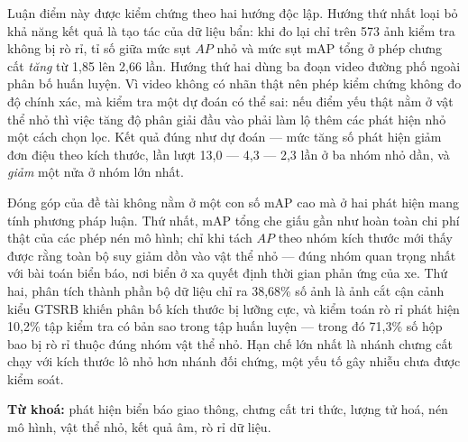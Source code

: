 Luận điểm này được kiểm chứng theo hai hướng độc lập. Hướng thứ nhất loại bỏ khả năng kết quả là
tạo tác của dữ liệu bẩn: khi đo lại chỉ trên 573 ảnh kiểm tra không bị rò rỉ, tỉ số giữa mức sụt
$AP$ nhỏ và mức sụt mAP tổng ở phép chưng cất \emph{tăng} từ 1,85 lên 2,66 lần. Hướng thứ hai dùng
ba đoạn video đường phố ngoài phân bố huấn luyện. Vì video không có nhãn thật nên phép kiểm chứng
không đo độ chính xác, mà kiểm tra một dự đoán có thể sai: nếu điểm yếu thật nằm ở vật thể nhỏ thì
việc tăng độ phân giải đầu vào phải làm lộ thêm các phát hiện nhỏ một cách chọn lọc. Kết quả đúng
như dự đoán --- mức tăng số phát hiện giảm đơn điệu theo kích thước, lần lượt 13,0 --- 4,3 --- 2,3
lần ở ba nhóm nhỏ dần, và \emph{giảm} một nửa ở nhóm lớn nhất.

Đóng góp của đề tài không nằm ở một con số mAP cao mà ở hai phát hiện mang tính phương pháp luận.
Thứ nhất, mAP tổng che giấu gần như hoàn toàn chi phí thật của các phép nén mô hình; chỉ khi tách
$AP$ theo nhóm kích thước mới thấy được rằng toàn bộ suy giảm dồn vào vật thể nhỏ --- đúng nhóm
quan trọng nhất với bài toán biển báo, nơi biển ở xa quyết định thời gian phản ứng của xe. Thứ hai,
phân tích thành phần bộ dữ liệu chỉ ra 38,68\% số ảnh là ảnh cắt cận cảnh kiểu GTSRB khiến phân bố
kích thước bị lưỡng cực, và kiểm toán rò rỉ phát hiện 10,2\% tập kiểm tra có bản sao trong tập huấn
luyện --- trong đó 71,3\% số hộp bao bị rò rỉ thuộc đúng nhóm vật thể nhỏ. Hạn chế lớn nhất là nhánh
chưng cất chạy với kích thước lô nhỏ hơn nhánh đối chứng, một yếu tố gây nhiễu chưa được kiểm soát.

\vspace{0.5cm}
\noindent\textbf{Từ khoá:} phát hiện biển báo giao thông, chưng cất tri thức, lượng tử hoá,
nén mô hình, vật thể nhỏ, kết quả âm, rò rỉ dữ liệu.
